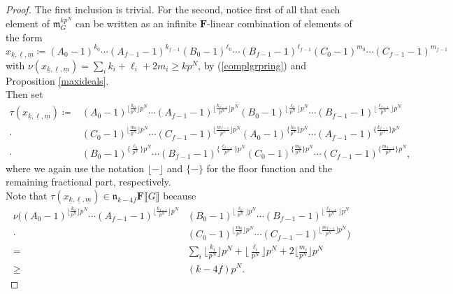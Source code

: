 \documentclass[11pt, oneside]{article}
\theoremstyle{definition}
\begin{document}
	\begin{proof}
		The first inclusion is trivial. For the second, notice first of all that each element of $\mathfrak m_G^{kp^N}$ can be written as an infinite $\mathbf F$-linear combination of elements of the form $$x_{\underline k,\underline\ell,\underline m}\coloneqq(A_0-1)^{k_0}\cdots(A_{f-1}-1)^{k_{f-1}}(B_0-1)^{\ell_0}\cdots(B_{f-1}-1)^{\ell_{f-1}}(C_0-1)^{m_0}\cdots(C_{f-1}-1)^{m_{f-1}}$$ with $\nu(x_{\underline k,\underline\ell,\underline m})=\sum_ik_i+\ell_i+2m_i\geq kp^N$, by (\ref{complgrpring}) and Proposition \ref{maxideals}.\\
		Then set \begin{align*}\tau(x_{\underline k,\underline\ell,\underline m})\coloneqq&(A_0-1)^{\lfloor\frac{k_0}{p^N}\rfloor p^N}\cdots(A_{f-1}-1)^{\lfloor\frac{k_{f-1}}{p^N}\rfloor p^N}(B_0-1)^{\lfloor\frac{\ell_0}{p^N}\rfloor p^N}\cdots(B_{f-1}-1)^{\lfloor\frac{\ell_{f-1}}{p^N}\rfloor p^N}\\\cdot&(C_0-1)^{\lfloor\frac{m_0}{p^N}\rfloor p^N}\cdots(C_{f-1}-1)^{\lfloor\frac{m_{f-1}}{p^N}\rfloor p^N}(A_0-1)^{\{\frac{k_0}{p^N}\} p^N}\cdots(A_{f-1}-1)^{\{\frac{k_{f-1}}{p^N}\} p^N}\\\cdot&(B_0-1)^{\{\frac{\ell_0}{p^N}\} p^N}\cdots(B_{f-1}-1)^{\{\frac{\ell_{f-1}}{p^N}\} p^N}(C_0-1)^{\{\frac{m_0}{p^N}\} p^N}\cdots(C_{f-1}-1)^{\{\frac{m_{f-1}}{p^N}\} p^N},\end{align*} where we again use the notation $\lfloor-\rfloor$ and $\{-\}$ for the floor function and the remaining fractional part, respectively.\\ Note that $\tau(x_{\underline k,\underline\ell,\underline m})\in\mathfrak n_{k-4f}\mathbf F\llbracket G\rrbracket$ because \begin{align*}
			\nu\Big((A_0-1)^{\lfloor\frac{k_0}{p^N}\rfloor p^N}\cdots(A_{f-1}-1)^{\lfloor\frac{k_{f-1}}{p^N}\rfloor p^N}&(B_0-1)^{\lfloor\frac{\ell_0}{p^N}\rfloor p^N}\cdots(B_{f-1}-1)^{\lfloor\frac{\ell_{f-1}}{p^N}\rfloor p^N}\\\cdot&(C_0-1)^{\lfloor\frac{m_0}{p^N}\rfloor p^N}\cdots(C_{f-1}-1)^{\lfloor\frac{m_{f-1}}{p^N}\rfloor p^N}\Big)\\=&\sum_i\lfloor\frac{k_i}{p^N}\rfloor p^N+\lfloor\frac{\ell_i}{p^N}\rfloor p^N+2\lfloor\frac{m_i}{p^N}\rfloor p^N\\\geq&(k-4f)p^N.

\end{align*}
\end{proof}
\end{document}
